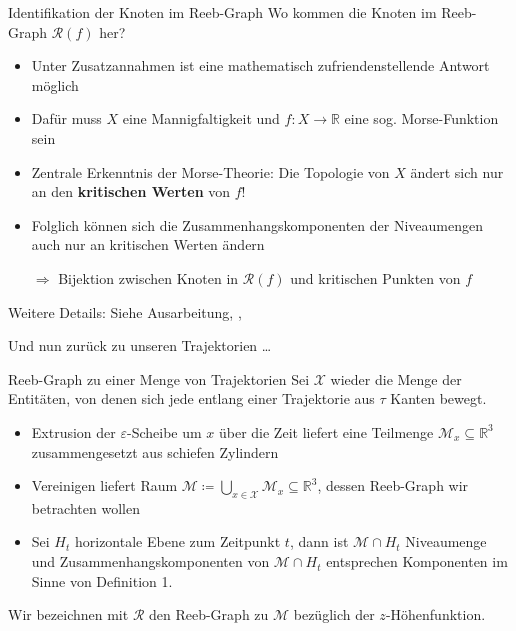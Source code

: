 \documentclass[
wide,
10pt,
xcolor={x11names,svgnames},
hyperref={pdfauthor={Jannes Bantje},colorlinks,urlcolor=maincolor,hidelinks=false,linkcolor=maincolor},
pantone312, 	%
euler-digits,
]{beamer}
\newcommand{\bet}[1]{\textbf{\color{maincolor}#1}}
\theoremstyle{definition}
\begin{document}
\begin{frame}{Identifikation der Knoten im Reeb-Graph}
    Wo kommen die Knoten im Reeb-Graph $\mathcal{R}(f)$ her? \pause
    \begin{itemize}[<+->]
        \item Unter Zusatzannahmen ist eine mathematisch zufriendenstellende Antwort möglich
        \item Dafür muss $X$ eine Mannigfaltigkeit und $f \colon X \to \mathbb{R}$ eine sog. Morse-Funktion sein
        \item Zentrale Erkenntnis der Morse-Theorie: Die Topologie von $X$ ändert sich nur an den \bet{kritischen Werten} von $f$!
        \item Folglich können sich die Zusammenhangskomponenten der Niveaumengen auch nur an kritischen Werten ändern
        \item[$\Rightarrow$] Bijektion zwischen Knoten in $\mathcal{R}(f)$ und kritischen Punkten von $f$
    \end{itemize}\pause
    Weitere Details: Siehe Ausarbeitung, \textcite{compTopo}, \textcite{MilnorMorse} \pause\vspace{1em}
    \begin{center}
        \large Und nun zurück zu unseren Trajektorien \ldots
    \end{center}
\end{frame}

\begin{frame}{Reeb-Graph zu einer Menge von Trajektorien}
    Sei $\mathcal{X}$ wieder die Menge der Entitäten, von denen sich jede entlang einer Trajektorie aus $\tau$ Kanten bewegt.
    \begin{itemize}
        \item Extrusion der $\varepsilon$-Scheibe um $x$ über die Zeit liefert eine Teilmenge $\mathcal{M}_x \subseteq \mathbb{R}^3$ zusammengesetzt aus schiefen Zylindern
        \item Vereinigen liefert Raum $\mathcal{M} \coloneqq \bigcup_{x \in \mathcal{X}} \mathcal{M}_x  \subseteq \mathbb{R}^3$, dessen Reeb-Graph wir betrachten wollen
        \item Sei $H_t$ horizontale Ebene zum Zeitpunkt $t$, dann ist $\mathcal{M} \cap H_t$ Niveaumenge und Zusammenhangskomponenten von $\mathcal{M} \cap H_t$ entsprechen Komponenten im Sinne von Definition 1.
    \end{itemize}
    \begin{definition}
        Wir bezeichnen mit $\mathcal{R}$ den Reeb-Graph zu $\mathcal{M}$ bezüglich der $z$-Höhenfunktion.
    \end{definition}
\end{frame}
\end{document}
